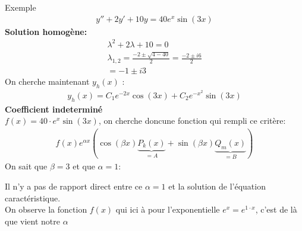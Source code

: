     \begin{parag}{Exemple}
        \begin{align*}
            y'' + 2y' + 10y = 40 e^{x}\sin(3x)
        \end{align*}
        \textbf{Solution homogène:}
        \\
        \begin{align*}
            \lambda^2 + 2 \lambda + 10 = 0\\
            \lambda_{1, 2} = \frac{-2 \pm \sqrt{4 - 40}}{2} = \frac{-2 \pm i6}{2}\\
            = -1 \pm i3
        \end{align*}
        On cherche maintenant $y_h(x)$ :
        \begin{align*}
            y_h(x) = C_1 e^{-2x} \cos(3x) + C_2e^{-x^2}\sin(3x)
        \end{align*}
        \textbf{Coefficient indeterminé}
        \\
        $f(x) = 40 \cdot e^x \sin(3x)$, on cherche doncune fonction qui rempli ce critère:
        \begin{align*}
           f(x)e^{ \alpha x}(\cos( \beta x) \underbrace{P_k(x)}_{=A} + \sin( \beta x) \underbrace{Q_m(x)}_{=B})
        \end{align*}
        On sait que $ \beta = 3$ et que $ \alpha = 1$:
        \begin{framedremark}
           Il n'y a pas de rapport direct entre ce $ \alpha  =1$ et la solution de l'équation caractéristique.
           \\
           On observe la fonction $f(x)$ qui ici à pour l'exponentielle $e^x = e^{ 1 \cdot x}$, c'est de là que vient notre $ \alpha$
        \end{framedremark}
        

\end{parag}
